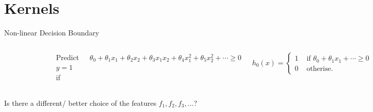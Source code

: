 \documentclass[9pt,dvipsnames]{beamer}
\begin{document}
\section{Kernels}
\begin{frame}{Non-linear Decision Boundary}
	\begin{columns}[T]
		\begin{figure}
			\centering
			\includegraphics[width=\textwidth]{imgs/svm_9.png}
		\end{figure}
		Predict \(y=1\) if 
		\vspace{0.3cm}
		
		\(\theta_{0}+\theta_{1} x_{1}+\theta_{2} x_{2}+\theta_{3} x_{1} x_{2}+\theta_{4} x_{1}^{2}+\theta_{5} x_{2}^{2}+\cdots \geq 0\)
		
		 $$
		 h_{0}(x)=\left\{\begin{array}{ll}1 & \text { if } \theta_{0}+\theta_{1} x_{1}+\cdots \geqslant 0 \\ 0 & \text { otherise. }\end{array}\right.
		 $$
		 
		\begin{align*}
			\theta_{0} & +\theta_{1} f_{1} + \theta_{2} f_{2} + \theta_{3} f_{3} + \cdots \\
			f_{1} & =x_{1}, \quad f_{2}=x_{2}, \quad f_{3}=x_{1} x_{2}, \\
			f_{4} & =x_{1}^{2}, \quad f_{5}=x_{2}^{2}, \ldots
		\end{align*}
	\end{columns}
	\vspace{0.3cm}
	Is there a different/ better choice of the features \(f_{1}, f_{2}, f_{3}, \ldots\)?
\end{frame}
\end{document}
